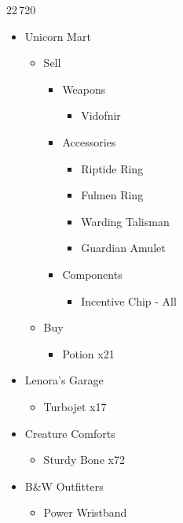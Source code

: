 \begin{shop}{22\,720}
\begin{multicols}{2}
\begin{itemize}
    \item Unicorn Mart
    \begin{itemize}
        \item Sell
        \begin{itemize}
            \item Weapons
            \begin{itemize}
                \item Vidofnir
            \end{itemize}
            \item Accessories
            \begin{itemize}
                \item Riptide Ring
                \item Fulmen Ring
                \item Warding Talisman
                \item Guardian Amulet
            \end{itemize}
            \item Components
            \begin{itemize}
                \item Incentive Chip - All
            \end{itemize}
        \end{itemize}
        \item Buy
        \begin{itemize}
            \item Potion x21
        \end{itemize}
    \end{itemize}
    \columnbreak
    \item Lenora's Garage
    \begin{itemize}
        \item Turbojet x17
    \end{itemize}
    \item Creature Comforts
    \begin{itemize}
        \item Sturdy Bone x72
    \end{itemize}
    \item B\&W Outfitters
    \begin{itemize}
        \item Power Wristband
    \end{itemize}
\end{itemize}
\end{multicols}
\end{shop}
